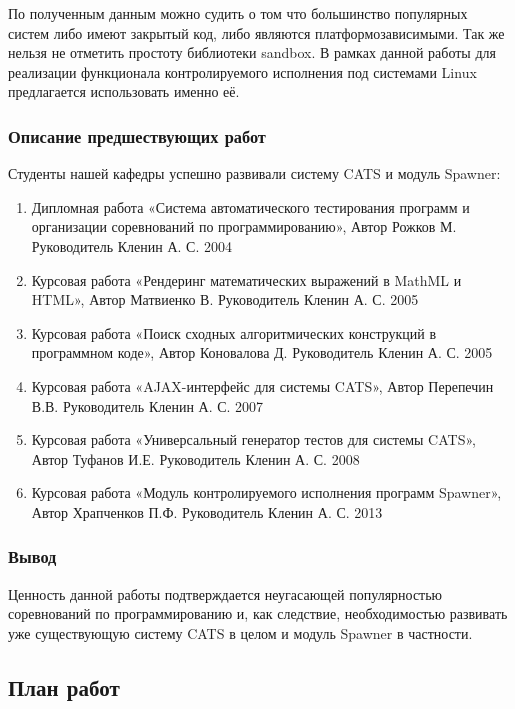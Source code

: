 \documentclass{imcs}
\begin{document}
По полученным данным можно судить о том что большинство популярных систем либо имеют закрытый код, либо являются платформозависимыми. Так же нельзя не отметить простоту библиотеки sandbox. В рамках данной работы для реализации функционала контролируемого исполнения под системами Linux предлагается использовать именно её.


\subsubsection{Описание предшествующих работ}
Студенты нашей кафедры успешно развивали систему CATS и модуль Spawner:
\begin{enumerate}

    \item Дипломная работа «Система автоматического тестирования программ и организации соревнований по программированию», Автор Рожков М. Руководитель Кленин А. С. 2004\cite{rozhkov}
    \item Курсовая работа «Рендеринг математических выражений в MathML и HTML», Автор Матвиенко В. Руководитель Кленин А. С. 2005\cite{matvienko}
    \item Курсовая работа «Поиск сходных алгоритмических конструкций в программном коде», Автор Коновалова Д. Руководитель Кленин А. С. 2005\cite{konovalova}
    \item Курсовая работа «AJAX-интерфейс для системы CATS», Автор Перепечин В.В. Руководитель Кленин А. С. 2007\cite{perepechin}
    \item Курсовая работа «Универсальный генератор тестов для системы CATS», Автор Туфанов И.Е. Руководитель Кленин А. С. 2008\cite{tuphanov}
    \item Курсовая работа «Модуль контролируемого исполнения программ Spawner», Автор Храпченков П.Ф. Руководитель Кленин А. С. 2013\cite{khrapchenkov}
\end{enumerate}

\subsubsection{Вывод}

Ценность данной работы подтверждается неугасающей популярностью соревнований по программированию и, как следствие, необходимостью развивать уже существующую систему CATS в целом и модуль Spawner в частности. 

\subsection{План работ}
\end{document}
